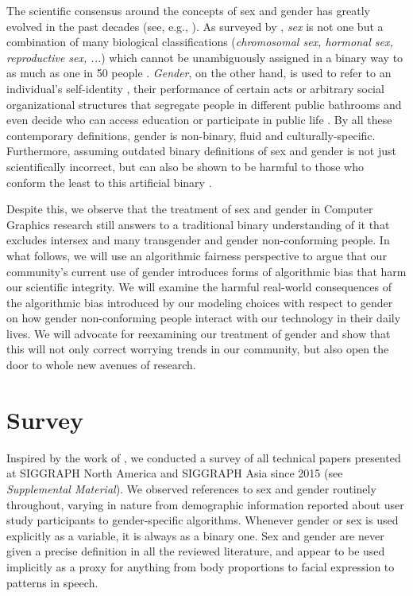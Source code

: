 \documentclass[nonacm,sigconf,review,balance=false]{acmart}
\begin{document}
The scientific consensus around the concepts of sex and gender has greatly evolved in the past decades (see, e.g., \cite{pmid30377332}). As surveyed by \citet{fausto2012sex}, \emph{sex} is not one but a combination of many biological classifications (\emph{chromosomal sex, hormonal sex, reproductive sex, ...}) which cannot be unambiguously assigned in a binary way to as much as one in 50 people \cite{blackless2000sexually}.
\emph{Gender}, on the other hand, is used to refer to an individual's self-identity \cite{money1972man}, their performance of certain acts \cite{butler2003gender} or arbitrary social organizational structures that segregate people in different public bathrooms and even decide who can access education or participate in public life \cite{lorber1994paradoxes}. By all these contemporary definitions, gender is non-binary, fluid and culturally-specific. Furthermore, assuming outdated binary definitions of sex and gender is not just scientifically incorrect, but can also be shown to be harmful to those who conform the least to this artificial binary \cite{un2015report}.

Despite this, we observe that the treatment of sex and gender in Computer Graphics research
still answers to a traditional binary understanding of it that excludes intersex and many transgender and
gender non-conforming people. In what follows, we will use an algorithmic fairness perspective to argue that our community's current use of gender introduces forms of algorithmic bias that harm our scientific integrity.
We will examine the harmful real-world consequences of the algorithmic bias introduced by our modeling
choices with respect to gender on how gender non-conforming people interact with
our technology in their daily lives. We will advocate for reexamining our
treatment of gender and show that this will not only correct worrying trends in
our community, but also open the door to whole new avenues of research.

\vspace{-0.1cm}
\section{Survey}


Inspired by the work of \citet{keyes2018misgendering}, we conducted a survey of
all technical papers presented at SIGGRAPH North America and SIGGRAPH Asia since
2015 (see \emph{Supplemental Material}). We observed references to sex and gender routinely
throughout, varying in nature from demographic information reported about user
study participants to gender-specific algorithms. Whenever gender or sex is used
explicitly as a variable, it is always as a binary one. Sex and gender are never given a precise definition in all the reviewed
literature, and appear to be used implicitly as a proxy for anything from body
proportions to facial expression to patterns in speech.
\end{document}
